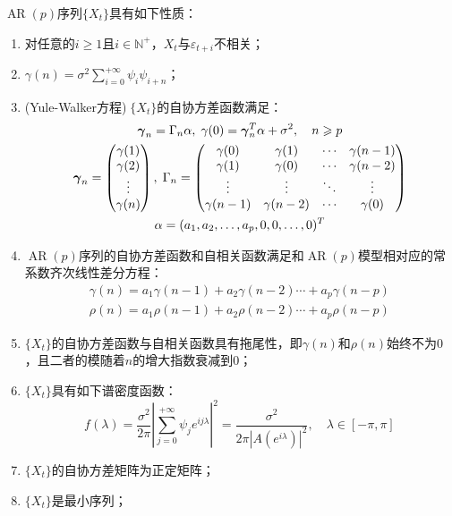 \begin{property}\label{prop:ARp}
	$\operatorname{AR}(p)$序列$\{X_t\}$具有如下性质：
	\begin{enumerate}
		\item 对任意的$i\geqslant1$且$i\in\mathbb{N}^+$，$X_t$与$\varepsilon_{t+i}$不相关；
		\item $\gamma(n)=\sigma^2\sum\limits_{i=0}^{+\infty}\psi_i\psi_{i+n}$；
		\item (Yule-Walker方程)$\;\{X_t\}$的自协方差函数满足：
		\begin{gather*}
			\boldsymbol{\gamma}_n=\Gamma_n\alpha,\;
			\gamma(0)=\boldsymbol{\gamma}_n^T\alpha+\sigma^2,\quad n\geqslant p \\
			\boldsymbol{\gamma}_n=
			\begin{pmatrix}
				\gamma(1) \\
				\gamma(2) \\
				\vdots \\
				\gamma(n)
			\end{pmatrix},\;
			\Gamma_n=
			\begin{pmatrix}
				\gamma(0) & \gamma(1) & \cdots & \gamma(n-1) \\
				\gamma(1) & \gamma(0) & \cdots & \gamma(n-2) \\
				\vdots & \vdots & \ddots & \vdots \\
				\gamma(n-1) & \gamma(n-2) & \cdots & \gamma(0) \\
			\end{pmatrix} \\
			\alpha=(a_1, a_2, \dots, a_{p},0,0,\dots,0)^T
		\end{gather*}
		\item $\operatorname{AR}(p)$序列的自协方差函数和自相关函数满足和$\operatorname{AR}(p)$模型相对应的常系数齐次线性差分方程：
		\begin{gather*}
			\gamma(n)=a_1\gamma(n-1)+a_2\gamma(n-2)\cdots+a_p\gamma(n-p) \\
			\rho(n)=a_1\rho(n-1)+a_2\rho(n-2)\cdots+a_p\rho(n-p)
		\end{gather*}
		\item $\{X_t\}$的自协方差函数与自相关函数具有拖尾性，即$\gamma(n)$和$\rho(n)$始终不为$0$，且二者的模随着$n$的增大指数衰减到$0$；
		\item $\{X_t\}$具有如下谱密度函数：
		\begin{equation*}
			f(\lambda)=\frac{\sigma^2}{2\pi}\left|\sum_{j=0}^{+\infty}\psi_je^{ij\lambda}\right|^2=\frac{\sigma^2}{2\pi|A(e^{i\lambda})|^2},\quad\lambda\in[-\pi,\pi]
		\end{equation*}
		\item $\{X_t\}$的自协方差矩阵为正定矩阵；
		\item $\{X_t\}$是最小序列；
	\end{enumerate}
\end{property}
